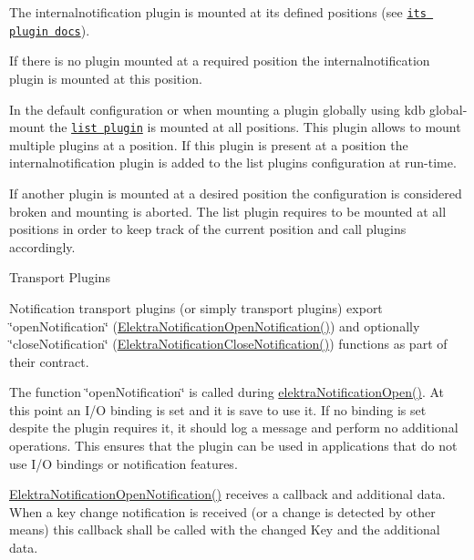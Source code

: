 The internalnotification plugin is mounted at its defined positions (see \href{https://www.libelektra.org/plugins/internalnotification}{\tt its plugin docs}).


\begin{DoxyItemize}
\item If there is no plugin mounted at a required position the internalnotification plugin is mounted at this position.
\item In the default configuration or when mounting a plugin globally using {\ttfamily kdb global-\/mount} the \href{https://www.libelektra.org/plugins/list}{\tt list plugin} is mounted at all positions. This plugin allows to mount multiple plugins at a position. If this plugin is present at a position the internalnotification plugin is added to the list plugin\textquotesingle{}s configuration at run-\/time.
\item If another plugin is mounted at a desired position the configuration is considered broken and mounting is aborted. The list plugin requires to be mounted at all positions in order to keep track of the current position and call plugins accordingly.
\end{DoxyItemize}

\begin{DoxyParagraph}{Transport Plugins}

\end{DoxyParagraph}
Notification transport plugins (or simply transport plugins) export \char`\"{}open\+Notification\char`\"{} (\hyperlink{kdbnotificationinternal_8h_adf7cf73a2740a3852b73d607b911a254}{Elektra\+Notification\+Open\+Notification()}) and optionally \char`\"{}close\+Notification\char`\"{} (\hyperlink{kdbnotificationinternal_8h_adc260d2c576df585aaa965cf97bc9284}{Elektra\+Notification\+Close\+Notification()}) functions as part of their contract.

The function \char`\"{}open\+Notification\char`\"{} is called during \hyperlink{group__kdbnotification_gaeae96154abdb5fdbf1b34a01e2b23e44}{elektra\+Notification\+Open()}. At this point an I/O binding is set and it is save to use it. If no binding is set despite the plugin requires it, it should log a message and perform no additional operations. This ensures that the plugin can be used in applications that do not use I/O bindings or notification features.

\hyperlink{kdbnotificationinternal_8h_adf7cf73a2740a3852b73d607b911a254}{Elektra\+Notification\+Open\+Notification()} receives a callback and additional data. When a key change notification is received (or a change is detected by other means) this callback shall be called with the changed Key and the additional data. 

